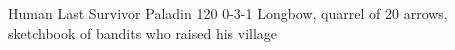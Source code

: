 \begin{filledCS}%
  {\composeHumanName}%
  {Human}%
  {Last Survivor}%
  {Paladin}%
  {{1}{2}{0}}%
  {{0}{-3}{-1}}%
  {%
    \setcounter{Cultivation}{2}
    \setcounter{Performance}{1}
    \setcounter{Stealth}{1}
    \setcounter{Brawl}{1}
    \setcounter{Projectiles}{1}
    \Dagger
  }%
  {\unstoppable}%
  {Longbow, quarrel of 20 arrows, sketchbook of bandits who raised his \gls{village}}%

  \renewcommand\rank{Fodder}
  \renewcommand\characterDebt{100 \glspl{sp}}

\end{filledCS}


